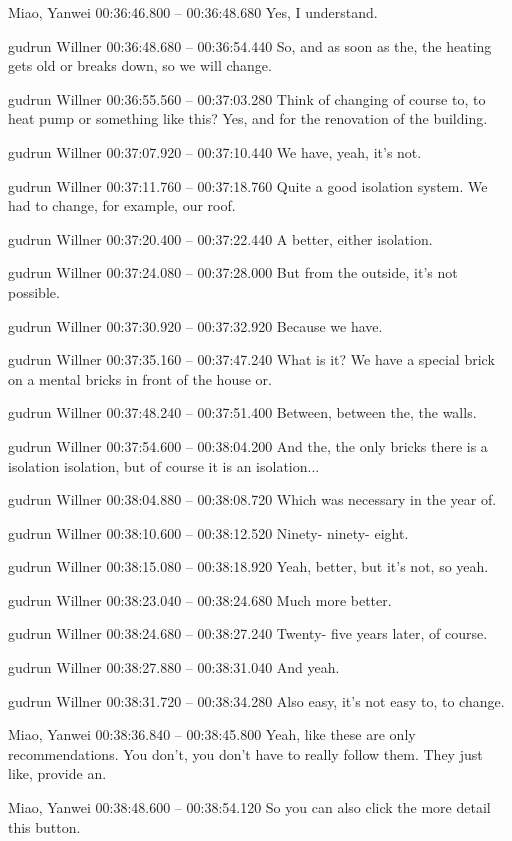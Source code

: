 {Miao, Yanwei 00:36:46.800 -- 00:36:48.680
Yes, I understand.

gudrun Willner 00:36:48.680 -- 00:36:54.440
So, and as soon as the, the heating gets old or breaks down, so we will change.

gudrun Willner 00:36:55.560 -- 00:37:03.280
Think of changing of course to, to heat pump or something like this? Yes, and for the renovation of the building.

gudrun Willner 00:37:07.920 -- 00:37:10.440
We have, yeah, it's not.

gudrun Willner 00:37:11.760 -- 00:37:18.760
Quite a good isolation system. We had to change, for example, our roof.

gudrun Willner 00:37:20.400 -- 00:37:22.440
A better, either isolation.

gudrun Willner 00:37:24.080 -- 00:37:28.000
But from the outside, it's not possible.

gudrun Willner 00:37:30.920 -- 00:37:32.920
Because we have.

gudrun Willner 00:37:35.160 -- 00:37:47.240
What is it? We have a special brick on a mental bricks in front of the house or.

gudrun Willner 00:37:48.240 -- 00:37:51.400
Between, between the, the walls.

gudrun Willner 00:37:54.600 -- 00:38:04.200
And the, the only bricks there is a isolation isolation, but of course it is an isolation...

gudrun Willner 00:38:04.880 -- 00:38:08.720
Which was necessary in the year of.

gudrun Willner 00:38:10.600 -- 00:38:12.520
Ninety- ninety- eight.

gudrun Willner 00:38:15.080 -- 00:38:18.920
Yeah, better, but it's not, so yeah.

gudrun Willner 00:38:23.040 -- 00:38:24.680
Much more better.

gudrun Willner 00:38:24.680 -- 00:38:27.240
Twenty- five years later, of course.

gudrun Willner 00:38:27.880 -- 00:38:31.040
And yeah.

gudrun Willner 00:38:31.720 -- 00:38:34.280
Also easy, it's not easy to, to change.

Miao, Yanwei 00:38:36.840 -- 00:38:45.800
Yeah, like these are only recommendations. You don't, you don't have to really follow them. They just like, provide an.

Miao, Yanwei 00:38:48.600 -- 00:38:54.120
So you can also click the more detail this button.

}
